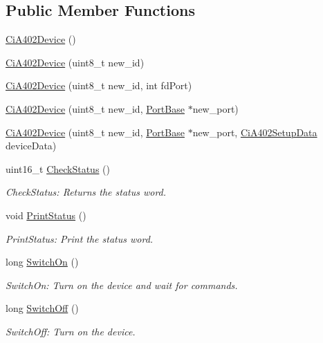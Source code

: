 \subsection*{Public Member Functions}
\begin{DoxyCompactItemize}
\item 
\hyperlink{classCiA402Device_a894ef30b3c5a0ed291b086ad2156e4c1}{Ci\+A402\+Device} ()
\item 
\hyperlink{classCiA402Device_a77998e6d9ac4b75764612f3cab7426ef}{Ci\+A402\+Device} (uint8\+\_\+t new\+\_\+id)
\item 
\hyperlink{classCiA402Device_a084b18ac995775f5079c8b260ec4c6c8}{Ci\+A402\+Device} (uint8\+\_\+t new\+\_\+id, int fd\+Port)
\item 
\hyperlink{classCiA402Device_a017bcbc5d6e7a87b950b3cf2fcff1c41}{Ci\+A402\+Device} (uint8\+\_\+t new\+\_\+id, \hyperlink{classPortBase}{Port\+Base} $\ast$new\+\_\+port)
\item 
\hyperlink{classCiA402Device_af89b69466c797cc162a66f121c802b67}{Ci\+A402\+Device} (uint8\+\_\+t new\+\_\+id, \hyperlink{classPortBase}{Port\+Base} $\ast$new\+\_\+port, \hyperlink{classCiA402SetupData}{Ci\+A402\+Setup\+Data} device\+Data)
\item 
uint16\+\_\+t \hyperlink{classCiA402Device_a5a034b00c87d2ec9ec98157b772465d9}{Check\+Status} ()
\begin{DoxyCompactList}\small\item\em Check\+Status\+: Returns the status word. \end{DoxyCompactList}\item 
void \hyperlink{classCiA402Device_a9d5d8df28085395a3ab711107a181ebc}{Print\+Status} ()
\begin{DoxyCompactList}\small\item\em Print\+Status\+: Print the status word. \end{DoxyCompactList}\item 
long \hyperlink{classCiA402Device_ab77bce0d7f42429f5f8f092aacb02754}{Switch\+On} ()
\begin{DoxyCompactList}\small\item\em Switch\+On\+: Turn on the device and wait for commands. \end{DoxyCompactList}\item 
long \hyperlink{classCiA402Device_a97acf47b3e3751c85fa70091d3bdfa6a}{Switch\+Off} ()
\begin{DoxyCompactList}\small\item\em Switch\+Off\+: Turn on the device. \end{DoxyCompactList}\item 

\end{DoxyCompactItemize}
